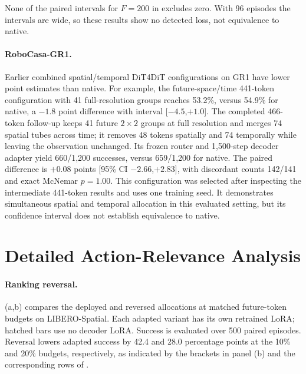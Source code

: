 None of the paired intervals for $F=200$ in  excludes zero.
With 96 episodes the intervals are wide, so these results show no detected loss, not equivalence to native.

\paragraph{RoboCasa-GR1.}
Earlier combined spatial/temporal DiT4DiT configurations on GR1 have lower point estimates than native.
For example, the future-space/time 441-token configuration with 41 full-resolution groups reaches 53.2\%, versus 54.9\% for native, a $-1.8$ point difference with interval [$-4.5$,$+1.0$].
The completed 466-token follow-up keeps 41 future $2\times2$ groups at full resolution and merges 74 spatial tubes across time; it removes 48 tokens spatially and 74 temporally while leaving the observation unchanged.
Its frozen router and 1,500-step decoder adapter yield 660/1,200 successes, versus 659/1,200 for native.
The paired difference is $+0.08$ points [95\% CI $-2.66$,$+2.83$], with discordant counts 142/141 and exact McNemar $p=1.00$.
This configuration was selected after inspecting the intermediate 441-token results and uses one training seed.
It demonstrates simultaneous spatial and temporal allocation in this evaluated setting, but its confidence interval does not establish equivalence to native.

\section{Detailed Action-Relevance Analysis}
\label{sec:supp_relevance}


\paragraph{Ranking reversal.}
(a,b) compares the deployed and reversed allocations at matched future-token budgets on LIBERO-Spatial.
Each adapted variant has its own retrained LoRA; hatched bars use no decoder LoRA.
Success is evaluated over 500 paired episodes.
Reversal lowers adapted success by 42.4 and 28.0 percentage points at the 10\% and 20\% budgets, respectively, as indicated by the brackets in panel (b) and the corresponding rows of .

